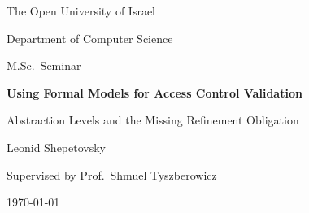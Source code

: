 \begin{titlepage}
\centering
\vspace*{1cm}
{\large The Open University of Israel\par}
{\large Department of Computer Science\par}
\vspace{0.5cm}
{\large M.Sc.\ Seminar\par}
\vspace{3cm}
{\LARGE\bfseries Using Formal Models for Access Control Validation\par}
\vspace{0.6cm}
{\Large Abstraction Levels and the Missing Refinement Obligation\par}
\vspace{3cm}
{\large Leonid Shepetovsky\par}
\vspace{1.5cm}
{\large Supervised by Prof.\ Shmuel Tyszberowicz\par}
\vfill
{\large \today\par}
\end{titlepage}
